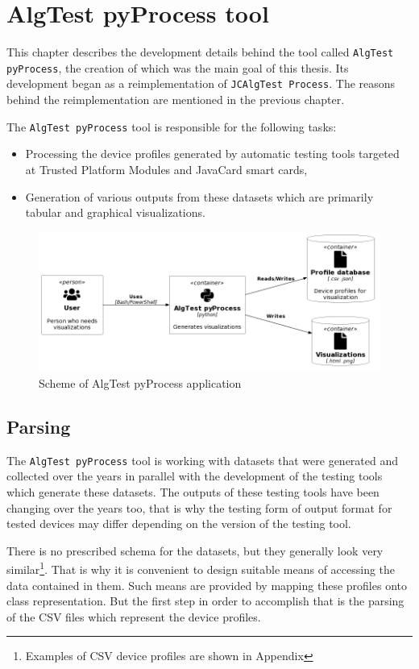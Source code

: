 \chapter{AlgTest pyProcess tool}
This chapter describes the development details behind the tool called \texttt{AlgTest pyProcess}, the creation of which was the main goal of this thesis. Its development began as a reimplementation of \texttt{JCAlgTest Process}. The reasons behind the reimplementation are mentioned in the previous chapter.

The \texttt{AlgTest pyProcess} tool is responsible for the following tasks:
\begin{itemize}
    \item Processing the device profiles generated by automatic testing tools targeted at Trusted Platform Modules and JavaCard smart cards,
    \item Generation of various outputs from these datasets which are primarily tabular and graphical visualizations.
\end{itemize}
\begin{figure}[h]
    \centering
    \includegraphics[width=\textwidth]{img/scheme.png}
    \caption{Scheme of AlgTest pyProcess application}
    \label{fig:algtest-process-scheme}
\end{figure}


\section{Parsing}
The \texttt{AlgTest pyProcess} tool is working with datasets that were generated and collected over the years in parallel with the development of the testing tools which generate these datasets. The outputs of these testing tools have been changing over the years too, that is why the testing form of output format for tested devices may differ depending on the version of the testing tool.

There is no prescribed schema for the datasets, but they generally look very similar\footnote{Examples of CSV device profiles are shown in Appendix}. That is why it is convenient to design suitable means of accessing the data contained in them. Such means are provided by mapping these profiles onto class representation. But the first step in order to accomplish that is the parsing of the CSV files which represent the device profiles. 



